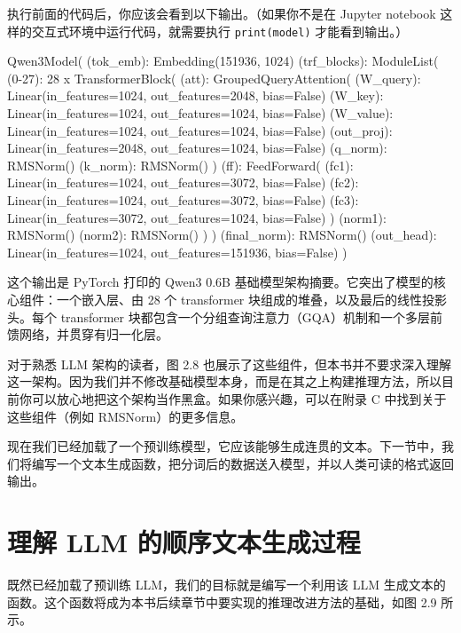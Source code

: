 执行前面的代码后，你应该会看到以下输出。（如果你不是在 Jupyter notebook 这样的交互式环境中运行代码，就需要执行 \texttt{print(model)} 才能看到输出。）

\begin{codebox}
Qwen3Model(
  (tok_emb): Embedding(151936, 1024)
  (trf_blocks): ModuleList(
    (0-27): 28 x TransformerBlock(
      (att): GroupedQueryAttention(
        (W_query): Linear(in_features=1024, out_features=2048, bias=False)
        (W_key): Linear(in_features=1024, out_features=1024, bias=False)
        (W_value): Linear(in_features=1024, out_features=1024, bias=False)
        (out_proj): Linear(in_features=2048, out_features=1024, bias=False)
        (q_norm): RMSNorm()
        (k_norm): RMSNorm()
      )
      (ff): FeedForward(
        (fc1): Linear(in_features=1024, out_features=3072, bias=False)
        (fc2): Linear(in_features=1024, out_features=3072, bias=False)
        (fc3): Linear(in_features=3072, out_features=1024, bias=False)
      )
      (norm1): RMSNorm()
      (norm2): RMSNorm()
    )
  )
  (final_norm): RMSNorm()
  (out_head): Linear(in_features=1024, out_features=151936, bias=False)
)
\end{codebox}

这个输出是 PyTorch 打印的 Qwen3 0.6B 基础模型架构摘要。它突出了模型的核心组件：一个嵌入层、由 28 个 transformer 块组成的堆叠，以及最后的线性投影头。每个 transformer 块都包含一个分组查询注意力（GQA）机制和一个多层前馈网络，并贯穿有归一化层。

对于熟悉 LLM 架构的读者，图 2.8 也展示了这些组件，但本书并不要求深入理解这一架构。因为我们并不修改基础模型本身，而是在其之上构建推理方法，所以目前你可以放心地把这个架构当作黑盒。如果你感兴趣，可以在附录 C 中找到关于这些组件（例如 RMSNorm）的更多信息。


现在我们已经加载了一个预训练模型，它应该能够生成连贯的文本。下一节中，我们将编写一个文本生成函数，把分词后的数据送入模型，并以人类可读的格式返回输出。

\section{理解 LLM 的顺序文本生成过程}

既然已经加载了预训练 LLM，我们的目标就是编写一个利用该 LLM 生成文本的函数。这个函数将成为本书后续章节中要实现的推理改进方法的基础，如图 2.9 所示。

